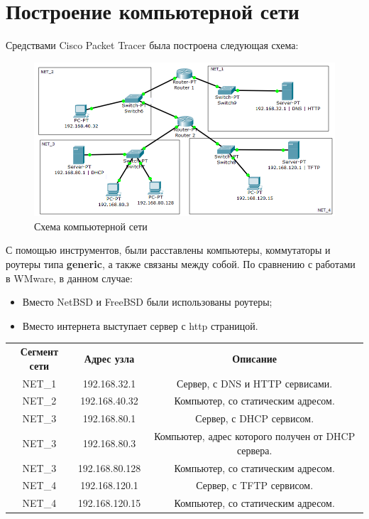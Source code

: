 \documentclass[14pt,a4paper,report]{report}
\begin{document}
\section{Построение компьютерной сети}
Средствами Cisco Packet Tracer была построена следующая схема:
\begin{figure}[h]
  \centering
  \includegraphics[width=\textwidth]{img/my_kks}
  \caption{Схема компьютерной сети}
\end{figure}
С помощью инструментов, были расставлены компьютеры, коммутаторы и роутеры типа \textbf{generic}, а также связаны между собой. По сравнению с работами в WMware, в данном случае:
\begin{itemize}
\item Вместо NetBSD и FreeBSD были использованы роутеры;
\item Вместо интернета выступает сервер с http страницой.
\end{itemize}


\begin{center}
\begin{tabular}{ c c c }
\textbf{Сегмент сети}&\textbf{Адрес узла}&\textbf{Описание}\\  
NET\_1&192.168.32.1&Сервер, с DNS и HTTP сервисами.\\ 
NET\_2&192.168.40.32&Компьютер, со статическим адресом.\\ 
NET\_3&192.168.80.1&Сервер, с DHCP сервисом.\\ 
NET\_3&192.168.80.3&Компьютер, адрес которого получен от DHCP сервера.\\ 
NET\_3&192.168.80.128&Компьютер, со статическим адресом.\\ 
NET\_4&192.168.120.1&Сервер, с TFTP сервисом.\\ 
NET\_4&192.168.120.15&Компьютер, со статическим адресом.\\ 
\end{tabular}
\end{center}
\end{document}
